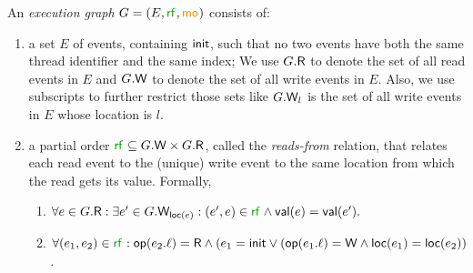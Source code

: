 An  \emph{execution graph} $G = (E, \rf{}, \mo{})$ consists of: 
\begin{enumerate}
    \item  a set $E$ of events, containing $\mathsf{init}$, such that no two events have both the same thread identifier and the same index; We use $G.\mathsf{R}$ to denote the set
    of all read events in $E$ and $G.\mathsf{W}$ to denote the set of all write events in $E$.
    Also,  we use subscripts to further restrict those sets like $G.\mathsf{W}_l$ is the set of all write events in $E$ whose location is $l$.
    \item a partial order $\rf{} \subseteq G.\opw \times G.\opr$, called the \emph{reads-from} relation, that relates each read event to the 
    (unique) write event to the same location from which the read gets its value. Formally,
    \begin{enumerate}
        \item $\forall e \in G.\opr : \exists e' \in G.\opw_{\loc(e)} : (e', e) \in \rf{} \wedge \val(e) = \val(e').$ 
        \item $\forall (e_1, e_2) \in \rf{} : \op(e_2.\ell) = \opr \wedge (e_1 = \init \vee (\op(e_1.\ell) = \opw \wedge \loc(e_1) = \loc(e_2))$. 

\end{enumerate}
\end{enumerate}
